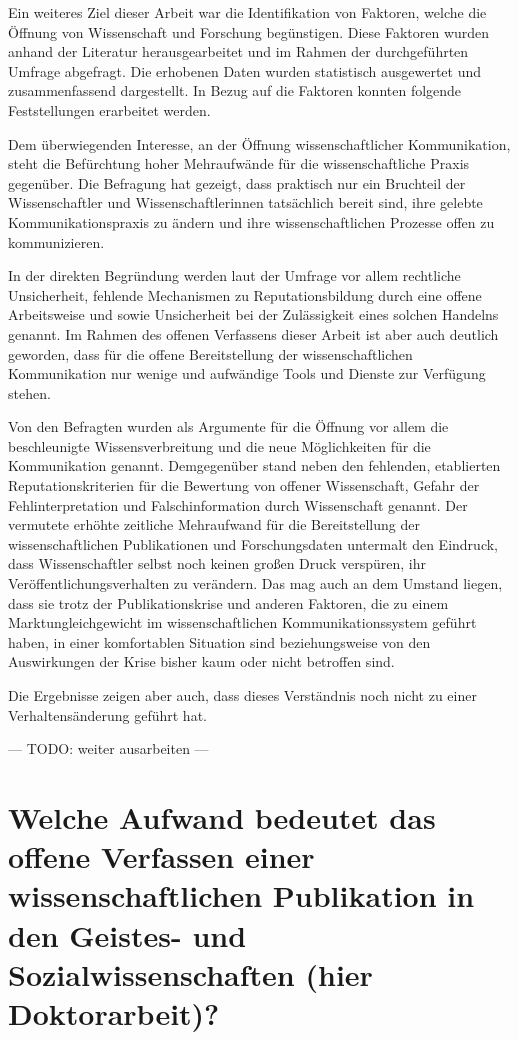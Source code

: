 Ein weiteres Ziel dieser Arbeit war die Identifikation von Faktoren, welche die Öffnung von Wissenschaft und Forschung begünstigen. Diese Faktoren wurden anhand der Literatur herausgearbeitet und im Rahmen der durchgeführten Umfrage abgefragt. Die erhobenen Daten wurden statistisch ausgewertet und zusammenfassend dargestellt. In Bezug auf die Faktoren konnten folgende Feststellungen erarbeitet werden.

Dem überwiegenden Interesse, an der Öffnung wissenschaftlicher Kommunikation, steht die Befürchtung hoher Mehraufwände für die wissenschaftliche Praxis gegenüber. Die Befragung hat gezeigt, dass praktisch nur ein Bruchteil der Wissenschaftler und Wissenschaftlerinnen tatsächlich bereit sind, ihre gelebte Kommunikationspraxis zu ändern und ihre wissenschaftlichen Prozesse offen zu kommunizieren.

In der direkten Begründung werden laut der Umfrage vor allem rechtliche Unsicherheit, fehlende Mechanismen zu Reputationsbildung durch eine offene Arbeitsweise und sowie Unsicherheit bei der Zulässigkeit eines solchen Handelns genannt. Im Rahmen des offenen Verfassens dieser Arbeit ist aber auch deutlich geworden, dass für die offene Bereitstellung der wissenschaftlichen Kommunikation nur wenige und aufwändige Tools und Dienste zur Verfügung stehen.

Von den Befragten wurden als Argumente für die Öffnung vor allem die beschleunigte Wissensverbreitung und die neue Möglichkeiten für die Kommunikation genannt. Demgegenüber stand neben den fehlenden, etablierten Reputationskriterien für die Bewertung von offener Wissenschaft, Gefahr der Fehlinterpretation und Falschinformation durch Wissenschaft genannt. Der vermutete erhöhte zeitliche Mehraufwand für die Bereitstellung der wissenschaftlichen Publikationen und Forschungsdaten untermalt den Eindruck, dass Wissenschaftler selbst noch keinen großen Druck verspüren, ihr Veröffentlichungsverhalten zu verändern. Das mag auch an dem Umstand liegen, dass sie trotz der Publikationskrise und anderen Faktoren, die zu einem Marktungleichgewicht im wissenschaftlichen Kommunikationssystem geführt haben, in einer komfortablen Situation sind beziehungsweise von den Auswirkungen der Krise bisher kaum oder nicht betroffen sind.

Die Ergebnisse zeigen aber auch, dass dieses Verständnis noch nicht zu einer Verhaltensänderung geführt hat.

--- TODO: weiter ausarbeiten ---

\section{Welche Aufwand bedeutet das offene Verfassen einer wissenschaftlichen Publikation in den Geistes- und Sozialwissenschaften (hier Doktorarbeit)?}

